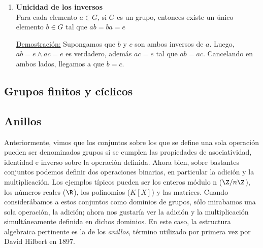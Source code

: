 \documentclass[../main.tex]{subfiles}
\begin{document}
{{\begin{enumerate}
            Una consecuencia de éste teorema es la unicidad de los inversos.
            
            \item \textbf{Unicidad de los inversos} \\
            Para cada elemento $a \in G$, si $G$ es un grupo, entonces existe un único elemento $b \in G$ tal que $ab = ba = e$
            
            \ul{Demostración:}
            Supongamos que $b$ y $c$ son ambos inversos de $a$. Luego, $ab = e \land ac = e$ es verdadero, además $ac = e$ tal que $ab = ac$. Cancelando en ambos lados, llegamos a que $b = c$.
        \end{enumerate}
    }
    
    \subsection{Grupos finitos y cíclicos}
    
    \subsection{Anillos} {
        \cite{gallian} Anteriormente, vimos que los conjuntos sobre los que se define una sola operación pueden ser denominados grupos si se cumplen las propiedades de asociatividad, identidad e inverso sobre la operación definida. Ahora bien, sobre bastantes conjuntos podemos definir dos operaciones binarias, en particular la adición y la multiplicación. Los ejemplos típicos pueden ser los enteros módulo n ($\Z/n\Z$), los números reales ($\R$), los polinomios ($K[X]$) y las matrices. Cuando considerábamos a estos conjuntos como dominios de grupos, sólo mirabamos una sola operación, la adición; ahora nos gustaría ver la adición y la multiplicación simultáneamente definida en dichos dominios. En este caso, la estructura algebraica pertinente es la de los \textit{anillos}, término utilizado por primera vez por David Hilbert en 1897.
        
}}
\end{document}
